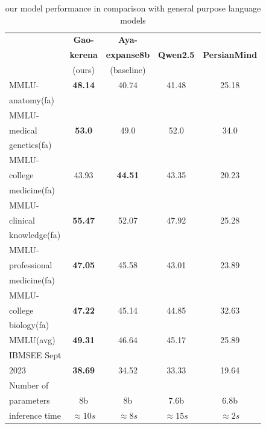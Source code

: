 \documentclass[conference]{IEEEtran}
\begin{document}
\begin{table}[ht]
	\centering
	\caption{
		our model performance 
		in comparison with general purpose language models
		}
	\begin{tabular}{|l|c|c|c|c|}  %
		\hline
		\textbf{} & \textbf{Gao-} & \textbf{Aya-} &  &  \\ 
		 & \textbf{kerena} & \textbf{expanse8b} & \textbf{Qwen2.5} & \textbf{PersianMind} \\
		 & (ours) & (baseline) &  &  \\ \hline
		MMLU- & \textbf{48.14} & 40.74 & 41.48 & 25.18 \\ 
		anatomy(fa) &  &  &  &  \\ \hline
		MMLU- &  &  &  &  \\
		medical & \textbf{53.0} & 49.0 & 52.0 & 34.0 \\ 
		genetics(fa) &  &  &  &  \\ \hline
		MMLU- &  &  &  &  \\
		college & 43.93 & \textbf{44.51} & 43.35 & 20.23 \\
		medicine(fa) &  &  &  &  \\ \hline
		MMLU- &  &  &  &  \\
		clinical& \textbf{55.47} & 52.07 & 47.92 & 25.28 \\
		knowledge(fa)&  &  &  &  \\ \hline
		MMLU- &  &  &  &  \\
        professional& \textbf{47.05} & 45.58 & 43.01 & 23.89 \\ 
        medicine(fa)&  &  &  &  \\ \hline
        MMLU- &  &  &  &  \\
        college& \textbf{47.22} & 45.14 & 44.85 & 32.63 \\
        biology(fa)&  &  &  &  \\ \hline
        MMLU(avg) & \textbf{49.31} & 46.64 & 45.17 & 25.89 \\ \hline
		IBMSEE Sept &  &  &  &  \\ 
        2023 & \textbf{38.69} & 34.52 & 33.33 & 19.64 \\  \hline
        Number of&  &  &  &  \\
        parameters & 8b & 8b & 7.6b & 6.8b \\ \hline
        inference time & $\approx 10s$ & $\approx 8s$ & $\approx 15s$ & $\approx 2s$ \\  \hline
	\end{tabular}
	\label{tab:model_results_on_mcqa_vs_general_purpose_languages}
\end{table}
\end{document}
